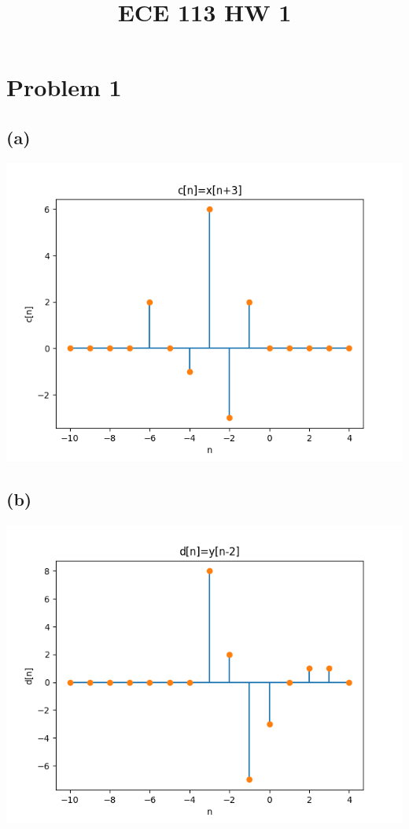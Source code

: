 
\title{ECE 113 HW 1}

\maketitle
\section*{Problem 1}
\subsection*{(a)}
\includegraphics[scale=0.5]{c.png}
\subsection*{(b)}
\includegraphics[scale=0.5]{d.png}

